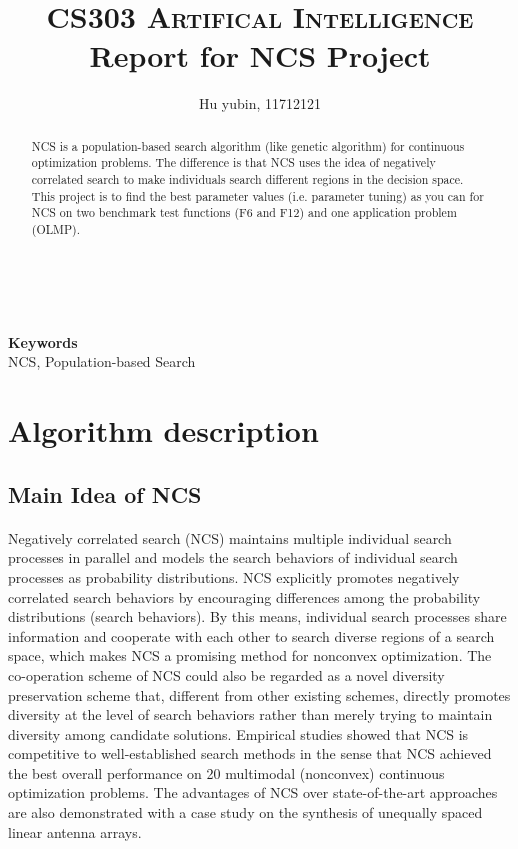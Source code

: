 \documentclass[10pt,letterpaper]{article}
\title{
		\usefont{OT1}{bch}{b}{n}
		\normalfont \normalsize \textsc{CS303 Artifical Intelligence} \\ [10pt]
		\huge Report for NCS Project \\
}
\author[1]{Hu yubin, 11712121}
\affil[1]{\small{Department of Computer Science and Engineering, Southern University of Science and Technology}}
\begin{document}
\maketitle

\begin{abstract}
NCS is a population-based search algorithm (like genetic algorithm) for continuous optimization problems. The difference is that NCS uses the idea of negatively correlated search to make individuals search different regions in the decision space. This project is to find the best parameter values (i.e. parameter tuning) as you can for NCS on two benchmark test functions (F6 and F12) and one application problem (OLMP).
\end{abstract} \\ 
\\ 
{\textbf{Keywords} \\
NCS, Population-based Search}

\section{Algorithm description}

\subsection{Main Idea of NCS}

\paragraph{}
Negatively correlated search (NCS) maintains multiple individual search processes in parallel and models the search behaviors of individual search processes as probability distributions\cite{Ke2016Negatively}. NCS explicitly promotes negatively correlated search behaviors by encouraging differences among the probability distributions (search behaviors). By this means, individual search processes share information and cooperate with each other to search diverse regions of a search space, which makes NCS a promising method for nonconvex optimization. The co-operation scheme of NCS could also be regarded as a novel diversity preservation scheme that, different from other existing schemes, directly promotes diversity at the level of search behaviors rather than merely trying to maintain diversity among candidate solutions. Empirical studies showed that NCS is competitive to well-established search methods in the sense that NCS achieved the best overall performance on 20 multimodal (nonconvex) continuous optimization problems. The advantages of NCS over state-of-the-art approaches are also demonstrated with a case study on the synthesis of unequally spaced linear antenna arrays.
\end{document}
